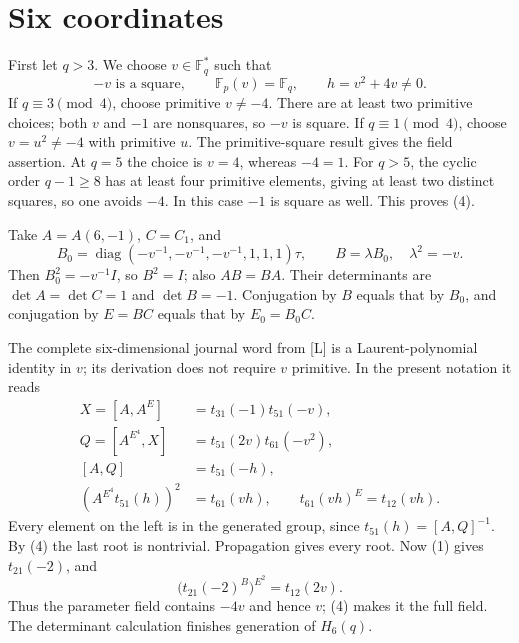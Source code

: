 \documentclass[11pt,a4paper]{article}
\newcommand{\diag}{\operatorname{diag}}
\newcommand{\F}{\mathbb F}
\begin{document}
\section{Six coordinates}
First let $q>3$. We choose $v\in\F_q^*$ such that
\[
 -v\text{ is a square},\qquad \F_p(v)=\F_q,
 \qquad h=v^2+4v\ne0.                                  \tag{4}
\]
If $q\equiv3\pmod4$, choose primitive $v\ne-4$.
There are at least two primitive choices; both $v$ and $-1$ are
nonsquares, so $-v$ is square. If $q\equiv1\pmod4$, choose
$v=u^2\ne-4$ with primitive $u$. The primitive-square result gives
the field assertion. At $q=5$ the choice is $v=4$, whereas $-4=1$.
For $q>5$, the cyclic order $q-1\ge8$ has at least four primitive
elements, giving at least two distinct squares, so one avoids $-4$.
In this case $-1$ is square as well. This proves (4).

Take $A=A(6,-1)$, $C=C_1$, and
\[
 B_0=\diag(-v^{-1},-v^{-1},-v^{-1},1,1,1)\tau,
 \qquad B=\lambda B_0,\quad\lambda^2=-v.
\]
Then $B_0^2=-v^{-1}I$, so $B^2=I$; also $AB=BA$.
Their determinants are $\det A=\det C=1$ and $\det B=-1$.
Conjugation by $B$ equals that by $B_0$, and conjugation by
$E=BC$ equals that by $E_0=B_0C$.

The complete six-dimensional journal word from [L] is a
Laurent-polynomial identity in $v$; its derivation does not require
$v$ primitive. In the present notation it reads
\begin{align*}
 X=[A,A^E]&=t_{31}(-1)t_{51}(-v),\\
 Q=[A^{E^4},X]&=t_{51}(2v)t_{61}(-v^2),\\
 [A,Q]&=t_{51}(-h),\\
 (A^{E^4}t_{51}(h))^2&=t_{61}(vh),\qquad
 t_{61}(vh)^E=t_{12}(vh).
\end{align*}
Every element on the left is in the generated group, since
$t_{51}(h)=[A,Q]^{-1}$. By (4) the last root is nontrivial.
Propagation gives every root. Now (1) gives $t_{21}(-2)$, and
\[
 \bigl(t_{21}(-2)^B\bigr)^{E^2}=t_{12}(2v).
\]
Thus the parameter field contains $-4v$ and hence $v$; (4) makes
it the full field. The determinant calculation finishes generation
of $H_6(q)$.
\end{document}
